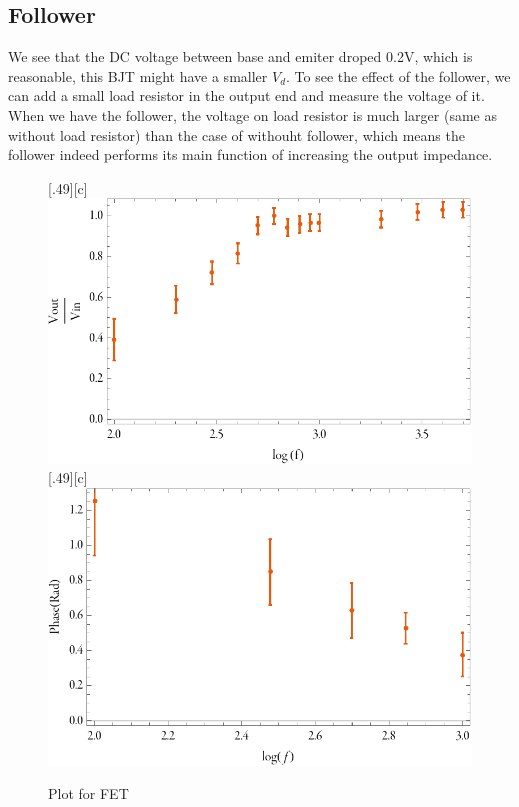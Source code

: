 \documentclass[aps,prl,reprint]{revtex4-1}
\begin{document}
\subsection{Follower}
We see that the DC voltage between base and emiter droped 0.2V, which is reasonable, this BJT might have a smaller $V_d$. To see the effect of the follower, we can add a small load resistor in the output end and measure the voltage of it. When we have the follower, the voltage on load resistor is much larger (same as without load resistor) than the case of withouht follower, which means the follower indeed performs its main function of increasing the output impedance.

    \begin{figure}[t]
    \centering
    [.49\linewidth][c]{%
        \includegraphics[width=.4\linewidth]{image/table3plot.pdf}}\quad
    [.49\linewidth][c]{%
        \includegraphics[width=.4\linewidth]{image/phase.pdf}}
    \caption{Plot for FET}
    \label{fig:table3plot}
    \end{figure}
\end{document}
